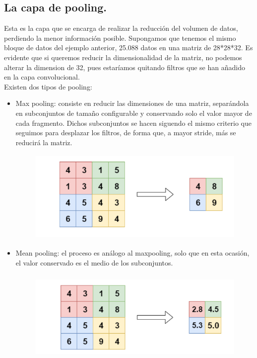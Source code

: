 \documentclass[a4paper,10pt]{article}
\begin{document}
\subsection{La capa de pooling.}
Esta es la capa que se encarga de realizar la reducción del volumen de datos, perdiendo la menor información posible. Supongamos que tenemos el mismo bloque de datos del ejemplo anterior, 25.088 datos en una matriz de 28*28*32. Es evidente que si queremos reducir la dimensionalidad de la matriz, no podemos alterar la dimension de 32, pues estaríamos quitando filtros que se han añadido en la capa convolucional.\\
Existen dos tipos de pooling:
\begin{itemize}
\item Max pooling: consiste en reducir las dimensiones de una matriz, separándola en subconjuntos de tamaño configurable y conservando solo el valor mayor de cada fragmento. Dichos subconjuntos se hacen siguendo el mismo criterio que seguimos para desplazar los filtros, de forma que, a mayor stride, más se reducirá la matriz.
\begin{figure}[H]
\centering
\includegraphics[width=11.0cm, height=4.5cm]{maxpool.png}
\end{figure}
\item Mean pooling: el proceso es análogo al maxpooling, solo que en esta ocasión, el valor conservado es el medio de los subconjuntos.
\begin{figure}[H]
\centering
\includegraphics[width=11.0cm, height=4.5cm]{meanpool.png}
\end{figure}
\end{itemize}
\end{document}
